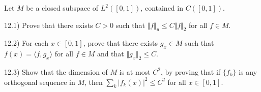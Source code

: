 \documentclass[10pt]{article}
\newenvironment{problem}[2][]{\begin{trivlist}
\item[\hskip \labelsep {\bfseries #1}\hskip \labelsep {\bfseries #2.}]}{\end{trivlist}}
\begin{document}
\begin{problem}{Question 12}

Let $M$ be a closed subspace of $L^2([0,1])$, contained in $C([0,1])$.

12.1) Prove that there exists $C > 0 $ such that $\Vert f \Vert_u \leq C \Vert f \Vert_2$ for all $f \in M$.

12.2) For each $x \in [0,1]$, prove that there exists $g_x \in M$ such that $f(x) = \langle f, g_x \rangle$ for all $f \in M$ and that $\Vert g_x \Vert_2 \leq C$.

12.3) Show that the dimension of $M$ is at most $C^2$, by proving that if $\{ f_k \}$ is any orthogonal sequence in $M$, then $\sum_{k} | f_k(x)|^2 \leq C^2$ for all $x \in [0,1]$.

\end{problem}
\end{document}
